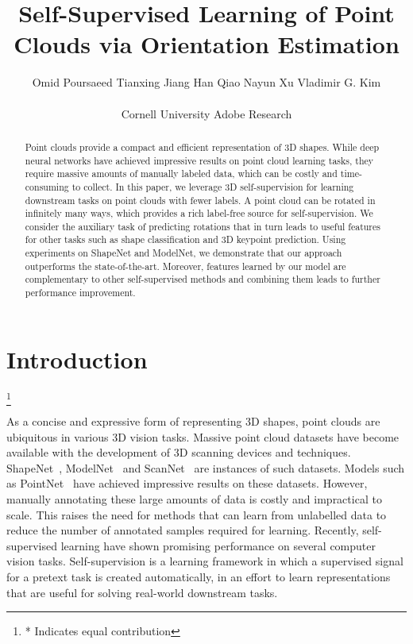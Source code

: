 \documentclass[10pt,twocolumn,letterpaper]{article}
\newcommand\blfootnote[1]{\begingroup
  \renewcommand\thefootnote{}\footnote{#1}\addtocounter{footnote}{-1}\endgroup
}
\begin{document}
\newcommand{\vova}[1]{{\bf\textcolor{red}{Vova: #1}}}

\title{Self-Supervised Learning of Point Clouds via Orientation Estimation}

\author{Omid Poursaeed \qquad
 Tianxing Jiang \qquad
 Han Qiao \qquad
 Nayun Xu \qquad
 Vladimir G. Kim \\ \\
  	{Cornell University}\qquad
    {Adobe Research}}
\maketitle
\begin{abstract}
Point clouds provide a compact and efficient representation of 3D shapes. While deep neural networks have achieved impressive results on point cloud learning tasks, they require massive amounts of manually labeled data, which can be costly and time-consuming to collect. In this paper, we leverage 3D self-supervision for learning downstream tasks on point clouds with fewer labels. A point cloud can be rotated in infinitely many ways, which provides a rich label-free source for self-supervision. We consider the auxiliary task of predicting rotations that in turn leads to useful features for other tasks such as shape classification and 3D keypoint prediction. Using experiments on ShapeNet and ModelNet, we demonstrate that our approach outperforms the state-of-the-art. Moreover, features learned by our model are complementary to other self-supervised methods and combining them leads to further performance improvement.    


\end{abstract}

\section{Introduction}
\blfootnote{* Indicates equal contribution}
As a concise and expressive form of representing 3D shapes, point clouds are ubiquitous in various 3D vision tasks. 
Massive point cloud datasets have become available with the development of 3D scanning devices and techniques. 
ShapeNet~\cite{chang2015shapenet}, ModelNet~\cite{wu20153d} and ScanNet~\cite{dai2017scannet} are instances of such datasets. Models such as PointNet~\cite{qi2017pointnet} have achieved impressive results on these datasets. However, manually annotating these large amounts of data is costly and impractical to scale. 
This raises the need for methods that can learn from unlabelled data to reduce the number of annotated samples required for learning. Recently, self-supervised learning have shown promising performance on several computer vision tasks. Self-supervision is a learning framework in which a supervised signal for a pretext task is created automatically, in an effort to learn representations that are useful for solving real-world downstream tasks. 
\end{document}
